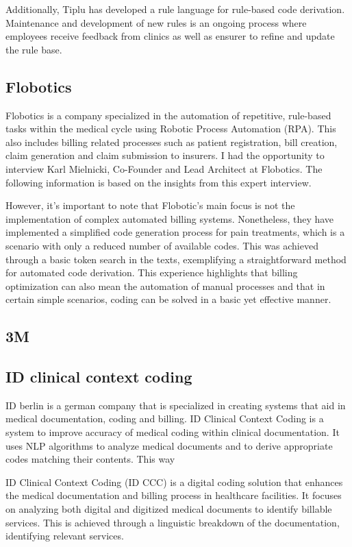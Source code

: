 Additionally, Tiplu has developed a rule language for rule-based code derivation.
Maintenance and development of new rules is an ongoing process where employees receive feedback from clinics as well as ensurer to refine and update the rule base.


\subsection{Flobotics}
Flobotics is a company specialized in the automation of repetitive, rule-based tasks within the medical cycle using Robotic Process Automation (RPA).
This also includes billing related processes such as patient registration, bill creation, claim generation and claim submission to insurers.
I had the opportunity to interview Karl Mielnicki, Co-Founder and Lead Architect at Flobotics.
The following information is based on the insights from this expert interview.

However, it's important to note that Flobotic's main focus is not the implementation of complex automated billing systems.
Nonetheless, they have implemented a simplified code generation process for pain treatments, which is a scenario with only a reduced number of available codes.
This was achieved through a basic token search in the texts, exemplifying a straightforward method for automated code derivation.
This experience highlights that billing optimization can also mean the automation of manual processes and that in certain simple scenarios,
coding can be solved in a basic yet effective manner.

\subsection{3M}



\subsection{ID clinical context coding}
ID berlin is a german company that is specialized in creating systems that aid in medical documentation, coding and billing.
ID Clinical Context Coding is a system to improve accuracy of medical coding within clinical documentation.
It uses NLP algorithms to analyze medical documents and to derive appropriate codes matching their contents.
This way

ID Clinical Context Coding (ID CCC) is a digital coding solution that enhances the medical documentation and billing process in healthcare facilities.
It focuses on analyzing both digital and digitized medical documents to identify billable services.
This is achieved through a linguistic breakdown of the documentation, identifying relevant services.

